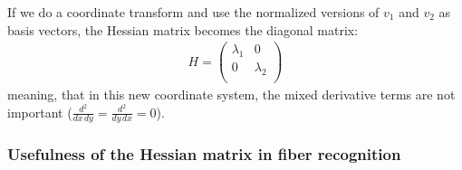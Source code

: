 \documentclass[12pt,english,twocolumn]{revtex4}
\begin{document}
If we do a coordinate transform and use the normalized versions of $v_1$ and $v_2$ as basis vectors, the Hessian matrix becomes the diagonal matrix:
\begin{align*}
    H =
    \left(
    \begin{array}{cc}
        \lambda_{1} & 0 \\
        0 & \lambda_{2} \\
    \end{array}
    \right)
\end{align*}
meaning, that in this new coordinate system, the mixed derivative terms are not important ($\frac{d^{2}}{dx \, dy} = \frac{d^{2}}{dy \, dx} = 0$).


\subsubsection{Usefulness of the Hessian matrix in fiber recognition} \label{sec:Hessian_usefulness}
\end{document}
